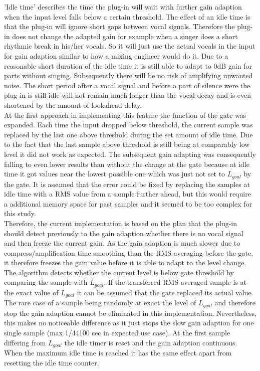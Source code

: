 'Idle time' describes the time the plug-in will wait with further gain adaption when the input level falls below a certain threshold. The effect of an idle time is that the plug-in will ignore short gaps between vocal signals. Therefore the plug-in does not change the adapted gain for example when a singer does a short rhythmic break in his/her vocals. So it will just use the actual vocals in the input for gain adaption similar to how a mixing engineer would do it. Due to a reasonable short duration of the idle time it is still able to adapt to 0dB gain for parts without singing. Subsequently there will be no risk of amplifying unwanted noise. The short period after a vocal signal and before a part of silence were the plug-in is still idle will not remain much longer than the vocal decay and is even shortened by the amount of lookahead delay.\\
At the first approach in implementing this feature the function of the gate was expanded. Each time the input dropped below threshold, the current sample was replaced by the last one above threshold during the set amount of idle time. Due to the fact that the last sample above threshold is still being at comparably low level it did not work as expected. The subsequent gain adapting was consequently falling to even lower results than without the change at the gate because at idle time it got values near the lowest possible one which was just not set to $L_{goal}$ by the gate. It is assumed that the error could be fixed by replacing the samples at idle time with a RMS value from a sample further ahead, but this would require a additional memory space for past samples and it seemed to be too complex for this study.\\
Therefore, the current implementation is based on the plan that the plug-in should detect previously to the gain adaption whether there is no vocal signal and then freeze the current gain. As the gain adaption is much slower due to compress/amplification time smoothing than the RMS averaging before the gate, it therefore freezes the gain value before it is able to adapt to the level change.\\
The algorithm detects whether the current level is below gate threshold by comparing the sample with $L_{goal}$. If the transferred RMS averaged sample is at the exact value of $L_{goal}$ it can be assumed that the gate replaced its actual value. The rare case of a sample being randomly at exact the level of $L_{goal}$ and therefore stop the gain adaption cannot be eliminated in this implementation. Nevertheless, this makes no noticeable difference as it just stops the slow gain adaption for one single sample (max 1/44100 sec in expected use case). At the first sample differing from $L_{goal}$ the idle timer is reset and the gain adaption continuous. When the maximum idle time is reached it has the same effect apart from resetting the idle time counter.\\
